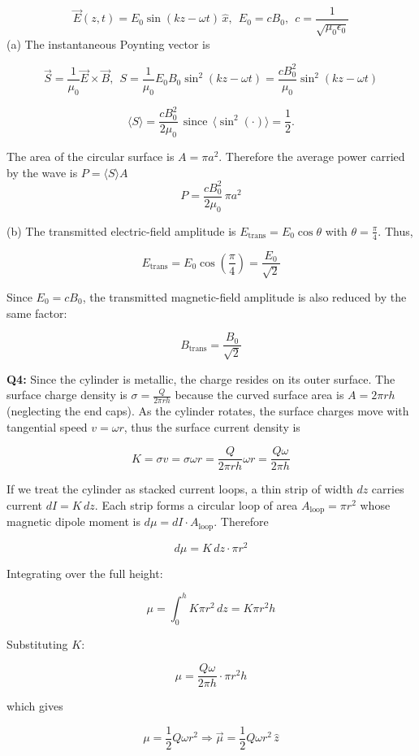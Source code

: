 \documentclass[a4paper,12pt]{article}
\begin{document}
\[
\vec E(z,t)=E_0\sin(kz-\omega t)\,\hat x, ~~E_0=cB_0,~~c=\frac{1}{\sqrt{\mu_0\epsilon_0}}
\]
(a) The instantaneous Poynting vector is

\[
\vec S
=
\frac{1}{\mu_0}\vec E\times\vec B, ~~ S=
\frac{1}{\mu_0}E_0B_0\sin^2(kz-\omega t) = \frac{cB_0^2}{\mu_0}\sin^2(kz-\omega t)
\]


\[
\boxed{
\langle S\rangle
=
\frac{cB_0^2}{2\mu_0}
}~~\text{since}~~\langle \sin^2(\cdot)\rangle=\frac{1}{2}.
\]

The area of the circular surface is $A=\pi a^2$. Therefore the average power carried by the wave is $P=\langle S\rangle A$
\[
\boxed{
P
=
\frac{cB_0^2}{2\mu_0}\,\pi a^2
}
\]

\bigskip

(b) The transmitted electric-field amplitude is $E_{\text{trans}}=E_0\cos\theta$ with $\theta=\frac{\pi}{4}$. Thus,

\[
E_{\text{trans}}
=
E_0\cos\left(\frac{\pi}{4}\right)
=
\frac{E_0}{\sqrt{2}}
\]

Since \(E_0=cB_0\), the transmitted magnetic-field amplitude is also reduced by the same factor:

\[
\boxed{
B_{\text{trans}}
=
\frac{B_0}{\sqrt{2}}
}
\]

\noindent

\vspace*{0.3cm}
\textbf{Q4:} Since the cylinder is metallic, the charge resides on its outer surface. The surface charge density is $\sigma=\frac{Q}{2\pi r h}$ because the curved surface area is $A=2\pi r h$ (neglecting the end caps). As the cylinder rotates, the surface charges move with tangential speed $v=\omega r$, thus the surface current density is

\[
K=\sigma v
=
\sigma \omega r = \frac{Q}{2\pi r h}\omega r = \frac{Q\omega}{2\pi h}
\]



If we treat the cylinder as stacked current loops, a thin strip of width \(dz\) carries current $dI=K\,dz$. Each strip forms a circular loop of area $A_{\text{loop}}=\pi r^2$ whose magnetic dipole moment is $d\mu=dI\cdot A_{\text{loop}}$. Therefore

\[
d\mu
=
K\,dz\cdot \pi r^2
\]

Integrating over the full height:

\[
\mu
=
\int_0^h K\pi r^2\,dz
=
K\pi r^2 h
\]

Substituting \(K\):

\[
\mu
=
\frac{Q\omega}{2\pi h}\cdot \pi r^2 h
\]

which gives

\[
\boxed{
\mu
=
\frac{1}{2}Q\omega r^2
} \Rightarrow \boxed{
\vec{\mu}
=
\frac{1}{2}Q\omega r^2\,\hat z
}
\]
\end{document}
